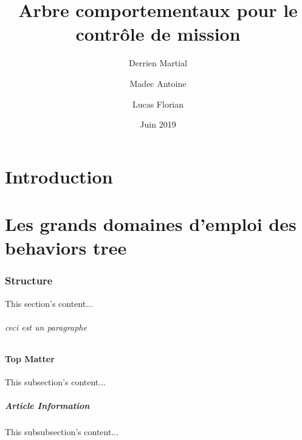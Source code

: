 \documentclass[titlepage]{article}
\title{Arbre comportementaux pour le contr\^ole de mission}
\author{
	Derrien Martial \\
	\and
	Madec Antoine \\
	\and
	Lucas Florian
}
\date{Juin 2019}
\begin{document}
	\maketitle
	\tableofcontents
	\hypersetup{linktocpage}
	\part{Introduction}
	\part{Les grands domaines d'emploi des behaviors tree}
	\section{Structure}
	This section's content...
	\paragraph{ceci est un paragraphe}	
	\subsection{Top Matter}
	This subsection's content...
	
	\subsubsection{Article Information}
	This subsubsection's content...
\end{document}
